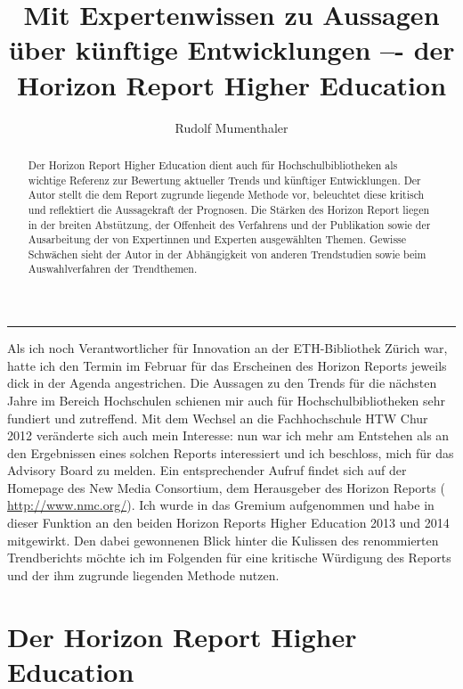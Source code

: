\documentclass[a4paper,
fontsize=11pt,
oneside,
numbers=noperiodatend,
parskip=half-,
bibliography=totoc,
final
]{scrartcl}
\title{\LARGE{Mit Expertenwissen zu Aussagen über künftige Entwicklungen –- der Horizon Report Higher Education}} %
\author{Rudolf Mumenthaler} %
\date{}
\begin{document}
\maketitle
\thispagestyle{fancyplain} 



\begin{center}
\end{center}

\begin{abstract}
\small
Der Horizon Report Higher Education dient auch für Hochschulbibliotheken als wichtige Referenz zur Bewertung aktueller Trends und künftiger Entwicklungen. Der Autor stellt die dem Report zugrunde liegende Methode vor, beleuchtet diese kritisch und reflektiert die Aussagekraft der Prognosen. Die Stärken des Horizon Report liegen in der breiten Abstützung, der Offenheit des Verfahrens und der Publikation sowie der Ausarbeitung der von Expertinnen und Experten ausgewählten Themen. Gewisse Schwächen sieht der Autor in der Abhängigkeit von anderen Trendstudien sowie beim Auswahlverfahren der Trendthemen.
\end{abstract}

\begin{center}\rule{3in}{0.4pt}\end{center}


Als ich noch Verantwortlicher für Innovation an der ETH-Bibliothek
Zürich war, hatte ich den Termin im Februar für das Erscheinen des
Horizon Reports jeweils dick in der Agenda angestrichen. Die Aussagen zu
den Trends für die nächsten Jahre im Bereich Hochschulen schienen mir
auch für Hochschulbibliotheken sehr fundiert und zutreffend. Mit dem
Wechsel an die Fachhochschule HTW Chur 2012 veränderte sich auch mein
Interesse: nun war ich mehr am Entstehen als an den Ergebnissen eines
solchen Reports interessiert und ich beschloss, mich für das Advisory
Board zu melden. Ein entsprechender Aufruf findet sich auf der Homepage
des New Media Consortium, dem Herausgeber des Horizon Reports (
\url{http://www.nmc.org/}). Ich wurde in das Gremium aufgenommen und
habe in dieser Funktion an den beiden Horizon Reports Higher Education
2013 und 2014 mitgewirkt. Den dabei gewonnenen Blick hinter die Kulissen
des renommierten Trendberichts möchte ich im Folgenden für eine
kritische Würdigung des Reports und der ihm zugrunde liegenden Methode
nutzen.

\section*{Der Horizon Report Higher
Education}\label{der-horizon-report-higher-education}
\end{document}
